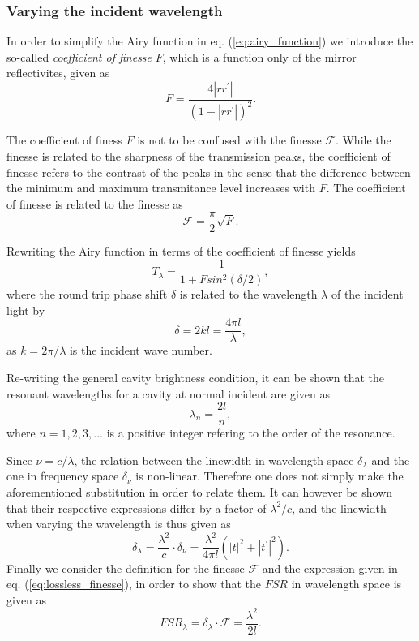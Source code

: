 \subsubsection{Varying the incident wavelength}

In order to simplify the Airy function in eq. (\ref{eq:airy_function}) we introduce the so-called \emph{coefficient of finesse} $F$, which is a function only of the mirror reflectivites, given as
\begin{equation}
    F = \frac{4 |rr^{\prime}|}{(1-|rr^{\prime}|)^2}.
\end{equation}

The coefficient of finess $F$ is not to be confused with the finesse $\mathcal{F}$. While the finesse is related to the sharpness of the transmission peaks, the coefficient of finesse refers to the contrast of the peaks in the sense that the difference between the minimum and maximum transmitance level increases with $F$. The coefficient of finesse is related to the finesse as 
\begin{equation}
    \mathcal{F} = \frac{\pi}{2} \sqrt{F}.
\end{equation}

Rewriting the Airy function in terms of the coefficient of finesse yields
\begin{equation}
    T_{\lambda} = \frac{1}{1+ F sin^2 \left(\delta / 2\right)},
\end{equation}
where the round trip phase shift $\delta$ is related to the wavelength $\lambda$ of the incident light by
\begin{equation}
    \delta = 2kl = \frac{4 \pi l }{\lambda},
\end{equation}
as $k = 2 \pi / \lambda$ is the incident wave number.

Re-writing the general cavity brightness condition, it can be shown that the resonant wavelengths for a cavity at normal incident are given as
\begin{equation}
    \lambda_n = \frac{2l}{n},
\end{equation}
where $n=1,2,3,...$ is a positive integer refering to the order of the resonance. 

Since $\nu = c / \lambda$, the relation between the linewidth in wavelength space $\delta_{\lambda}$ and the one in frequency space $\delta_{\nu}$ is non-linear. Therefore one does not simply make the aforementioned substitution in order to relate them. It can however be shown that their respective expressions differ by a factor of $\lambda^2/c$, and the linewidth when varying the wavelength is thus given as
\begin{equation}
    \delta_{\lambda} = \frac{\lambda^2}{c} \cdot \delta_{\nu} = \frac{\lambda^2}{4 \pi l} (|t|^2 + |t^{\prime}|^2).
\end{equation}
Finally we consider the definition for the finesse $\mathcal{F}$ and the expression given in eq. (\ref{eq:lossless_finesse}), in order to show that the $FSR$ in wavelength space is given as 
\begin{equation}
    FSR_{\lambda} = \delta_{\lambda} \cdot \mathcal{F} =  \frac{\lambda^2}{2l}.
\end{equation}



